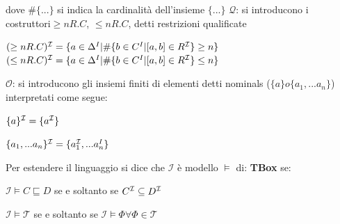 \documentclass[a4paper,11pt]{article}
\newcommand{\I}{%
        \ensuremath{\mathcal{I}}\xspace}
\newcommand{\Q}{%
  \ensuremath{\mathcal{Q}}\xspace}
\newcommand{\Onom}{%
  \ensuremath{\mathcal{O}}\xspace}
\newcommand{\T}{%
  \ensuremath{\mathcal{T}}\xspace}
\begin{document}
\begin{enumerate}
\begin{enumerate}[label*=\arabic*.]
dove $\#\{...\}$ si indica la cardinalità dell'insieme $\{...\}$\newline 
$\Q$: si introducono i costruttori$\geq nR.C$, $\leq nR.C$, detti restrizioni qualificate\newline
\begin{center}
		$(\geq nR.C)^{\I}=\{a \in \Delta^{I}|\#\{b \in C^{I} |[a,b] \in R^{\I}\}\geq n\}$\newline$(\leq nR.C)^{\I}=\{a \in \Delta^{I}|\#\{b \in C^{I} |[a,b] \in R^{\I}\}\leq n\}$\newline
\end{center}
$\Onom$: si introducono gli insiemi finiti di elementi 
detti nominals ($\{a\} o \{a_1,...a_n\} $) interpretati come segue:
\begin{center}
$\{a\}^{\I}=\{a^{\I}\}$
\end{center}
\begin{center}
$\{a_1,...a_n\}^{\I}=\{a_1^{\I},...a_n^{I}\}$
\end{center}\newpage
Per estendere il linguaggio si dice che $\I$ è modello $\models$ di:\newline
\textbf{TBox} se:
\begin{center}
	$\I \models C \sqsubseteq D$ se e soltanto se $C^{\I} \subseteq D^{\I}$	
\end{center}
\begin{center}
	$\I \models \T$ se e soltanto se $\I \models \Phi \forall \Phi \in \T $
\end{center}


\end{enumerate}
\end{enumerate}
\end{document}
